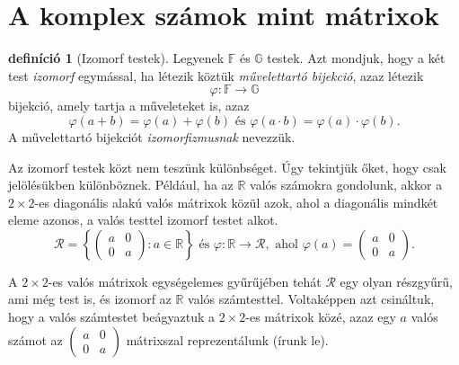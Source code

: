 \documentclass[9pt, a4paper, showtrims]{memoir}
\theoremstyle{plain}
\theoremstyle{remark}
\theoremstyle{definition}
\newtheorem{definition}[proposition]{definíció}
\begin{document}
\section{A komplex számok mint mátrixok}
\begin{definition}[Izomorf testek]
	Legyenek $\mathbb{F}$ és $\mathbb{G}$ testek.
	Azt mondjuk, hogy a két test \emph{izomorf} egymással,
	ha létezik köztük \emph{művelettartó bijekció}, azaz létezik
	\[
		\varphi:\mathbb{F}\to\mathbb{G}
	\]
	bijekció, amely tartja a műveleteket is, azaz
	\[
		\varphi\left( a+b \right)=\varphi\left( a \right)+\varphi\left( b \right)
		\text{ és }
		\varphi\left( a\cdot b \right)=\varphi\left( a \right)\cdot \varphi\left( b \right).
	\]
	A művelettartó bijekciót \emph{izomorfizmusnak} nevezzük.
\end{definition}
Az izomorf testek közt nem teszünk különbséget. Úgy tekintjük őket, hogy csak jelölésükben különböznek.
Például, ha az $\mathbb{R}$ valós számokra gondolunk,
akkor a $2\times 2$-es diagonális alakú valós mátrixok közül azok, ahol a diagonális mindkét eleme azonos,
a valós testtel izomorf testet alkot.
\[
	\mathcal{R}=\left\{
	\begin{pmatrix}
		a & 0 \\
		0 & a
	\end{pmatrix}
	:a\in\mathbb{R}
	\right\}
	\text{ és }
	\varphi:\mathbb{R}\to\mathcal{R},
	\text{ ahol }
	\varphi\left( a \right)
	=
	\begin{pmatrix}
		a & 0 \\
		0 & a
	\end{pmatrix}.
\]

A $2\times 2$-es valós mátrixok egységelemes gyűrűjében tehát $\mathcal{R}$ egy olyan részgyűrű, ami még test is,
és izomorf az $\mathbb{R}$ valós számtesttel.
Voltaképpen azt csináltuk, hogy a valós számtestet beágyaztuk a $2\times 2$-es mátrixok közé,
azaz egy $a$ valós számot az
\begin{math}
	\begin{pmatrix}
		a & 0 \\
		0 & a
	\end{pmatrix}
\end{math}
mátrixszal reprezentálunk (írunk le).
\end{document}
